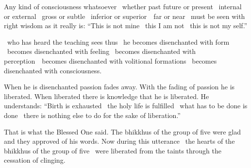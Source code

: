 \begin{english-only-hang}
Any kind of consciousness whatsoever \breathmark\ whether past future or present \breathmark\ internal or external \breathmark\ gross or subtle \breathmark\ inferior or \mbox{superior}~\breathmark\ far or near \breathmark\ must be seen with right wisdom as it really is: ``This is not mine \breathmark\ this I am not \breathmark\ this is not my self.''
\end{english-only-hang}

\begin{english-only-hang}
[Bhikkhus when a noble disciple\pagenote{%
  \textit{Ariyasāvaka} can be translated as “noble disciple” or “disciple of the noble one” (\textit{ariyassa}+\textit{sāvaka}=\textit{ariyasāvaka}). I have opted for the first option here because the discourse addresses the group of five monks who all were \textit{Ariyas} already at that time, but it needs to be kept in mind that the term \textit{ariyasāvaka} does not always refer to individuals who have already attained one of the four paths or fruits. This can be seen from MN 27, where a person is referred to as \textit{ariyasāvaka} without reference to any form of awakening-attainment. It is only at the end of the discourse that this \textit{ariyasāvaka} attains awakening.}]
\breathmark\ who has heard the teaching
sees thus \breathmark\ he becomes disenchanted with form \breathmark\ becomes disenchanted with feeling \breathmark\ becomes disenchanted with \mbox{perception}~\breathmark\ becomes disenchanted with volitional formations \breathmark\ becomes disenchanted with consciousness.
\end{english-only-hang}

\begin{english-only-hang}
When he is disenchanted passion fades away. With the fading of passion he is liberated. When liberated there is knowledge that he is liberated. He understands: ``Birth is exhausted \breathmark\ the holy life is fulfilled \breathmark\ what has to be done is done \breathmark\ there is nothing else to do for the sake of liberation.''
\end{english-only-hang}

\begin{english-only-hang}
  That is what the Blessed One said. The bhikkhus of the group of five were glad and they approved of his words. Now during this utterance \breathmark\ the hearts of the bhikkhus of the group of five \breathmark\ were liberated from the taints through the cessation of clinging.
\end{english-only-hang}

\suttaRef{[SN 22.59]}

